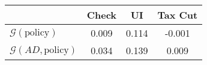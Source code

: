 \begin{tabular}{@{}lccc@{}} 
\toprule 
                          & Check      & UI    & Tax Cut    \\  \midrule 
$\mathcal{G}(\text{policy})$ & 0.009  & 0.114  & -0.001     \\ 
$\mathcal{G}(AD,\text{policy})$ & 0.034  & 0.139  & 0.009     \\ 
\end{tabular}  
